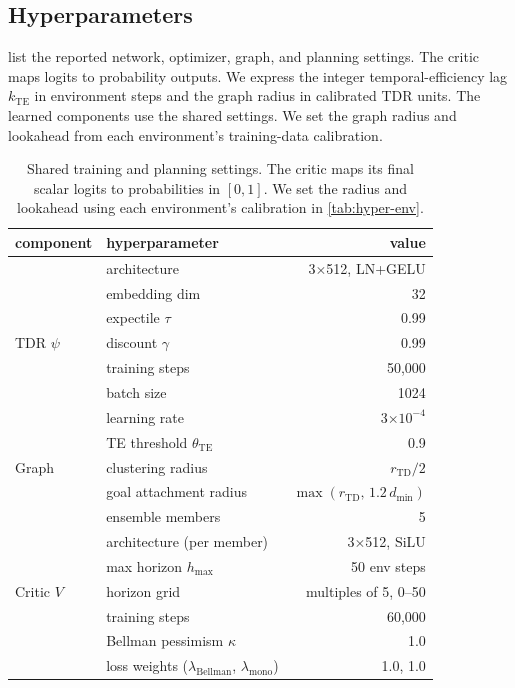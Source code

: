 \documentclass{article}
\newcommand{\psiT}{\psi}
\newcommand{\Htd}{r_{\mathrm{TD}}}
\theoremstyle{definition}
\theoremstyle{remark}
\begin{document}
\subsection{Hyperparameters}
\label{app:hyperparams}
 list the reported network, optimizer, graph,
and planning settings. The critic maps logits to probability outputs.
We express the integer temporal-efficiency lag $k_{\mathrm{TE}}$ in environment steps
and the graph radius in calibrated TDR units.
The learned components use the shared settings. We set the graph radius and lookahead
from each environment's training-data calibration.
\begin{table}[h]
\centering\small
\caption{Shared training and planning settings. The critic maps its final scalar logits to probabilities in $[0,1]$. We set the radius and lookahead using each environment's calibration in \cref{tab:hyper-env}.}
\label{tab:hyper-shared}
\begin{tabularx}{\linewidth}{lXr}
\toprule
component & hyperparameter & value \\
\midrule
\multirow{7}{*}{TDR $\psiT$}
 & architecture & 3$\times$512, LN+GELU \\
 & embedding dim & 32 \\
 & expectile $\tau$ & 0.99 \\
 & discount $\gamma$ & 0.99 \\
 & training steps & 50{,}000 \\
 & batch size & 1024 \\
 & learning rate & 3$\times10^{-4}$ \\
\midrule
\multirow{3}{*}{Graph}
 & TE threshold $\theta_{\mathrm{TE}}$ & 0.9 \\
 & clustering radius & $\Htd/2$ \\
 & goal attachment radius & $\max(\Htd,\,1.2\,d_{\min})$ \\
\midrule
\multirow{9}{*}{Critic $V$}
 & ensemble members & 5 \\
 & architecture (per member) & 3$\times$512, SiLU \\
 & max horizon $h_{\max}$ & 50 env steps \\
 & horizon grid & multiples of 5, 0--50 \\
 & training steps & 60{,}000 \\
 & Bellman pessimism $\kappa$ & 1.0 \\
 & loss weights ($\lambda_{\mathrm{Bellman}}$, $\lambda_{\mathrm{mono}}$) & 1.0, 1.0 \\

\end{tabularx}
\end{table}
\end{document}
